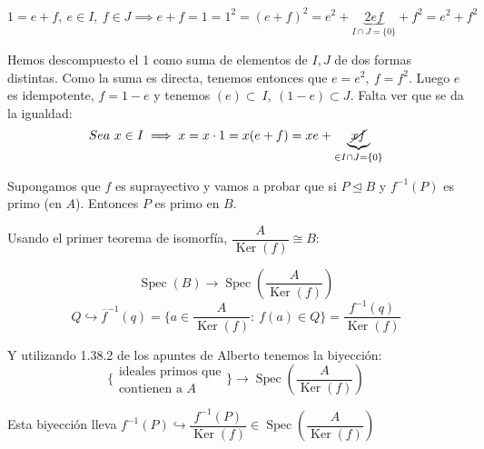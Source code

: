 \documentclass[openany]{book}
\begin{document}
\begin{exercise}
    $$ 1 = e+f,\ e \in I,\ f \in J \implies e+f = 1 = 1^2 = (e+f)^2 = e^2+\underbrace{2ef}_{I \cap J = \{0\}}+f^2 = e^2+f^2 $$

    Hemos descompuesto el 1 como suma de elementos de $ I,J $ de dos formas distintas. Como la suma es directa, tenemos entonces que $ e = e^2,\ f= f^2 $. Luego $ e $ es idempotente, $ f = 1-e $ y tenemos $ (e) \subset\ I,\ (1-e) \subset J $. Falta ver que se da la igualdad:
    $$ Sea\ x \in I \implies x =x\cdot 1 = x(e+f)=xe+\underbrace{\cancel{xf}}_{\in I \cap J = \{0\}} $$


\end{exercise}

\setcounter{ex}{13}

\begin{exercise}
    Supongamos que $ f $ es suprayectivo y vamos a probar que si $ P \unlhd B$ y $ f ^{-1}(P) $ es primo (en $ A $). Entonces $ P $ es primo en $ B $.

    Usando el primer teorema de isomorfía, $ \dfrac{A}{\operatorname{Ker}(f)}\cong B $:

    $$ \operatorname{Spec}(B)\to \operatorname{Spec}\left(\dfrac{A}{\operatorname{Ker}(f)}\right) $$
    $$ Q \hookrightarrow \overline{f}^{-1}(q) = \{a \in \dfrac{A}{\operatorname{Ker}(f)}:\ f(a) \in Q\} = \dfrac{f ^{-1}(q)}{\operatorname{Ker}(f)} $$

    Y utilizando 1.38.2 de los apuntes de Alberto tenemos la biyección:
    $$ \{\substack{\text{ideales primos que}\\\text{contienen a }A}\} \to \operatorname{Spec}(\dfrac{A}{\operatorname{Ker}(f)}) $$

    Esta biyección lleva $ f ^{-1}(P) \hookrightarrow \dfrac{f ^{-1}(P)}{\operatorname{Ker}(f)} \in \operatorname{Spec}(\dfrac{A}{\operatorname{Ker}(f)}) $
\end{exercise}

\setcounter{ex}{16}
\end{document}
